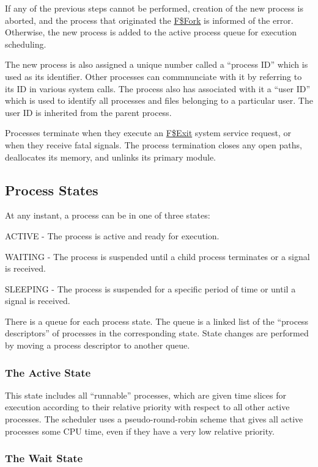 \documentclass[
]{article}
\begin{document}
If any of the previous steps cannot be performed, creation of the new
process is aborted, and the process that originated the
\hyperref[f.fork]{F\$Fork} is informed of the error. Otherwise, the new
process is added to the active process queue for execution scheduling.

The new process is also assigned a unique number called a ``process ID''
which is used as its identifier. Other processes can commnunciate with
it by referring to its ID in various system calls. The process also has
associated with it a ``user ID'' which is used to identify all processes
and files belonging to a particular user. The user ID is inherited from
the parent process.

Processes terminate when they execute an \hyperref[f.exit]{F\$Exit}
system service request, or when they receive fatal signals. The process
termination closes any open paths, deallocates its memory, and unlinks
its primary module.

\subsection{Process States}

At any instant, a process can be in one of three states:

ACTIVE - The process is active and ready for execution.

WAITING - The process is suspended until a child process terminates or a
signal is received.

SLEEPING - The process is suspended for a specific period of time or
until a signal is received.

There is a queue for each process state. The queue is a linked list of
the ``process descriptors'' of processes in the corresponding state.
State changes are performed by moving a process descriptor to another
queue.

\subsubsection{The Active State}

This state includes all ``runnable'' processes, which are given time
slices for execution according to their relative priority with respect
to all other active processes. The scheduler uses a pseudo-round-robin
scheme that gives all active processes some CPU time, even if they have
a very low relative priority.

\subsubsection{The Wait State}
\end{document}
